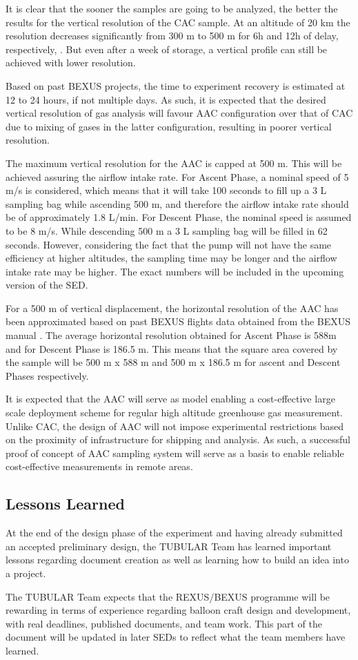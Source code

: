 \documentclass[a4paper,12pt,twoside]{article}
\begin{document}
It is clear that the sooner the samples are going to be analyzed, the better the results for the vertical resolution of the CAC sample. At an altitude of 20 km the resolution decreases significantly from 300 m to 500 m for 6h and 12h of delay, respectively, \cite{Membrive}. But even after a week of storage, a vertical profile can still be achieved with lower resolution.

Based on past BEXUS projects, the time to experiment recovery is estimated at 12 to 24 hours, if not multiple days. As such, it is expected that the desired vertical resolution of gas analysis will favour AAC configuration over that of CAC due to mixing of gases in the latter configuration, resulting in poorer vertical resolution.

The maximum vertical resolution for the AAC is capped at 500 m. This will be achieved assuring the airflow intake rate. For Ascent Phase, a nominal speed of 5 m/s is considered, which means that it will take 100 seconds to fill up a 3 L sampling bag while ascending 500 m, and therefore the airflow intake rate should be of approximately 1.8 L/min. For Descent Phase, the nominal speed is assumed to be 8 m/s. While descending 500 m a 3 L sampling bag will be filled in 62 seconds. However, considering the fact that the pump will not have the same efficiency at higher altitudes, the sampling time may be longer and the airflow intake rate may be higher. The exact numbers will be included in the upcoming version of the SED.  

For a 500 m of vertical displacement, the horizontal resolution of the AAC has been approximated based on past BEXUS flights data obtained from the BEXUS manual \cite{BexusManual}. The average horizontal resolution obtained for Ascent Phase is 588m and for Descent Phase is 186.5 m. This means that the square area covered by the sample will be 500 m x 588 m and 500 m x 186.5 m for ascent and Descent Phases respectively.

It is expected that the AAC will serve as model enabling a cost-effective large scale deployment scheme for regular high altitude greenhouse gas measurement. Unlike CAC, the design of AAC will not impose experimental restrictions based on the proximity of infrastructure for shipping and analysis. As such, a successful proof of concept of AAC sampling system will serve as a basis to enable reliable cost-effective measurements in remote areas.


 
\pagebreak
\subsection{Lessons Learned}
At the end of the design phase of the experiment and having already submitted an accepted preliminary design, the TUBULAR Team has learned important lessons regarding document creation as well as learning how to build an idea into a project. \par
The TUBULAR Team expects that the REXUS/BEXUS programme will be rewarding in terms of experience regarding balloon craft design and development, with real deadlines, published documents, and team work. This part of the document will be updated in later SEDs to reflect what the team members have learned.
\end{document}
